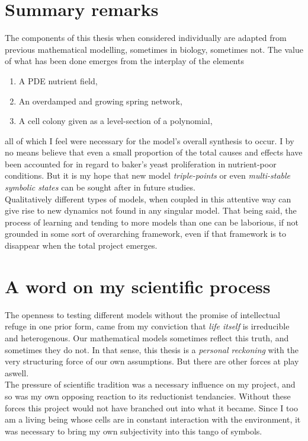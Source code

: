\conclusions

\section{Summary remarks}
The components of this thesis when considered individually
are adapted from previous mathematical 
modelling, sometimes in biology, sometimes not. The value of 
what has been done emerges from the interplay of the elements
\begin{enumerate}
    \item A PDE nutrient field,
    \item An overdamped and growing spring network,
    \item A cell colony given as a level-section of a polynomial,
\end{enumerate}
all of which I feel were necessary for the model's overall 
synthesis to occur. I by no means believe 
that even a small proportion of the total causes and effects
have been accounted for in regard to baker's yeast proliferation 
in nutrient-poor conditions. But it is my hope 
that new model \textit{triple-points} or even \textit{multi-stable symbolic states} 
can be sought after in future 
studies.
\\

Qualitatively different types of models, when coupled
in this attentive way can give rise to new dynamics not found in 
any singular model. That being said, 
the process of learning and tending to more models than one can be
laborious, if not grounded in some sort of overarching 
framework, even if that framework is to disappear 
when the total project emerges.
\\

\section{A word on my scientific process}
The openness to testing different models without 
the promise of intellectual refuge in one prior form, came 
from my conviction that \textit{life itself} is irreducible
and heterogenous. Our mathematical models sometimes reflect 
this truth, and sometimes 
they do not. In that sense, this thesis is a 
\textit{personal reckoning} with the very structuring 
force of our own assumptions. But there are other 
forces at play aswell.
\\

The pressure of scientific tradition was a necessary 
influence on my project, and so was 
my own opposing reaction to its reductionist tendancies.
Without these forces this project would not have 
branched out into what it became. Since 
I too am a living being whose cells 
are in constant interaction with the environment, 
it was necessary to bring my own subjectivity
into this tango of symbols.
\\

